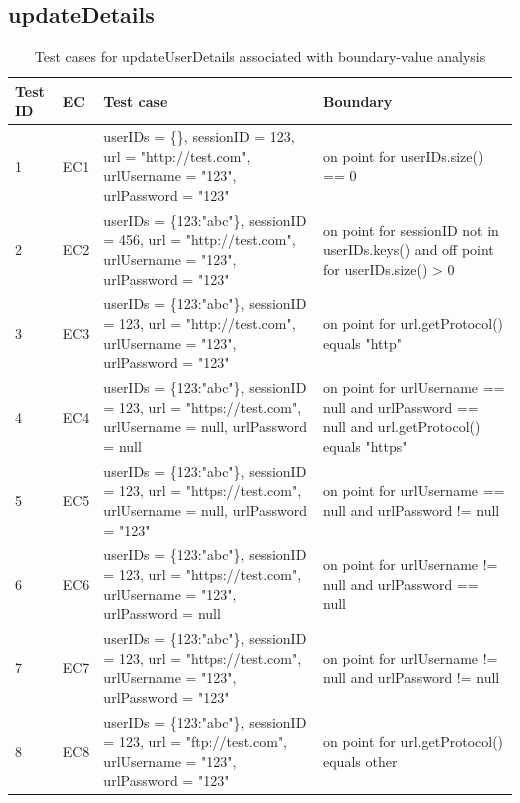 \documentclass{article}
\begin{document}
\subsection{updateDetails}
\begin{longtable}{|p{0.5cm}|p{0.5cm}|p{7cm}|p{5cm}|}
\caption{Test cases for updateUserDetails associated with boundary-value analysis}\\
\hline 
Test ID&EC&Test case&Boundary\\
\hline  
1&EC1&userIDs = \{\}, sessionID = 123, url = "http://test.com", urlUsername = "123", urlPassword = "123"&on point for userIDs.size() == 0\\
\hline
2&EC2&userIDs = \{123:"abc"\}, sessionID = 456, url = "http://test.com", urlUsername = "123", urlPassword = "123"&on point for sessionID not in userIDs.keys() and off point for userIDs.size() > 0\\
\hline
3&EC3&userIDs = \{123:"abc"\}, sessionID = 123, url = "http://test.com", urlUsername = "123", urlPassword = "123"&on point for url.getProtocol() equals "http"\\
\hline
4&EC4&userIDs = \{123:"abc"\}, sessionID = 123, url = "https://test.com", urlUsername = null, urlPassword = null&on point for urlUsername == null and urlPassword == null and url.getProtocol() equals "https"\\
\hline
5&EC5&userIDs = \{123:"abc"\}, sessionID = 123, url = "https://test.com", urlUsername = null, urlPassword = "123"&on point for urlUsername == null and urlPassword != null\\
\hline
6&EC6&userIDs = \{123:"abc"\}, sessionID = 123, url = "https://test.com", urlUsername = "123", urlPassword = null&on point for urlUsername != null and urlPassword == null\\
\hline
7&EC7&userIDs = \{123:"abc"\}, sessionID = 123, url = "https://test.com", urlUsername = "123", urlPassword = "123"&on point for urlUsername != null and urlPassword != null\\
\hline
8&EC8&userIDs = \{123:"abc"\}, sessionID = 123, url = "ftp://test.com", urlUsername = "123", urlPassword = "123"&on point for url.getProtocol() equals other\\
\hline
\end{longtable}
\end{document}
